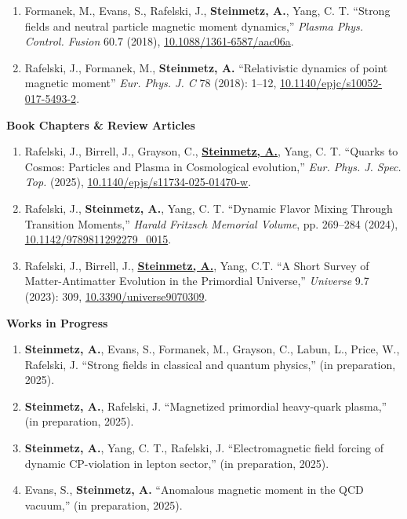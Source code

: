 \documentclass[11pt]{article}
\begin{document}
\begin{enumerate}[leftmargin=*,nosep]
    \item Formanek, M., Evans, S., Rafelski, J., \textbf{Steinmetz, A.}, Yang, C. T. ``Strong fields and neutral particle magnetic moment dynamics,'' \textit{Plasma Phys. Control. Fusion} 60.7 (2018), \href{https://doi.org/10.1088/1361-6587/aac06a}{10.1088/1361-6587/aac06a}.
    \item Rafelski, J., Formanek, M., \textbf{Steinmetz, A.} ``Relativistic dynamics of point magnetic moment'' \textit{Eur. Phys. J. C} 78 (2018): 1--12, \href{https://doi.org/10.1140/epjc/s10052-017-5493-2}{10.1140/epjc/s10052-017-5493-2}.
\end{enumerate}

\medskip

{\large\textbf{Book Chapters \& Review Articles}}

\begin{enumerate}[leftmargin=*,nosep]
    \item Rafelski, J., Birrell, J., Grayson, C., \textbf{\href{https://github.com/ajsteinmetz/thesis-collab-project}{Steinmetz, A.}}, Yang, C. T. ``Quarks to Cosmos: Particles and Plasma in Cosmological evolution,'' \textit{Eur. Phys. J. Spec. Top.} (2025), \href{https://doi.org/10.1140/epjs/s11734-025-01470-w}{10.1140/epjs/s11734-025-01470-w}.
    \item Rafelski, J., \textbf{Steinmetz, A.}, Yang, C. T. ``Dynamic Flavor Mixing Through Transition Moments,'' \textit{Harald Fritzsch Memorial Volume}, pp. 269--284 (2024), \href{https://doi.org/10.1142/9789811292279_0015}{10.1142/9789811292279\_0015}.
    \item Rafelski, J., Birrell, J., \textbf{\href{https://github.com/ajsteinmetz/a-short-survey}{Steinmetz, A.}}, Yang, C.T. ``A Short Survey of Matter-Antimatter Evolution in the Primordial Universe,'' \textit{Universe} 9.7 (2023): 309, \href{https://doi.org/10.3390/universe9070309}{10.3390/universe9070309}.
\end{enumerate}

\medskip

{\large\textbf{Works in Progress}}

\begin{enumerate}[leftmargin=*,nosep]
    \item \textbf{Steinmetz, A.}, Evans, S., Formanek, M., Grayson, C., Labun, L., Price, W., Rafelski, J. ``Strong fields in classical and quantum physics,'' (in preparation, 2025).
    \item \textbf{Steinmetz, A.}, Rafelski, J. ``Magnetized primordial heavy-quark plasma,'' (in preparation, 2025).
    \item \textbf{Steinmetz, A.}, Yang, C. T., Rafelski, J. ``Electromagnetic field forcing of dynamic CP-violation in lepton sector,'' (in preparation, 2025).
    \item Evans, S., \textbf{Steinmetz, A.} ``Anomalous magnetic moment in the QCD vacuum,'' (in preparation, 2025).
\end{enumerate}
\end{document}

